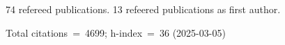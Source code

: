 74 refereed publications. 13 refeered publications as first author.

Total citations~=~4699; h-index~=~36 (2025-03-05)
